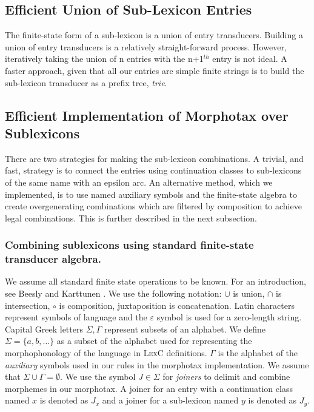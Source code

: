 \documentclass[postprint]{flammie}
\begin{document}
\subsection{Efficient Union of Sub-Lexicon Entries}
\label{subsec:lexc-union}

The finite-state form of a sub-lexicon is a union of entry
transducers.  Building a union of entry transducers is a relatively
straight-forward process. However, iteratively taking the union of n
entries with the n+1$^{th}$ entry is not ideal. A faster approach,
given that all our entries are simple finite strings is to build the
sub-lexicon transducer as a prefix tree, \emph{trie}.

\subsection{Efficient Implementation of Morphotax over Sublexicons}
\label{subsec:lexc-morphotax}

There are two strategies for making the sub-lexicon combinations. A
trivial, and fast, strategy is to connect the entries using
continuation classes to sub-lexicons of the same name with an epsilon
arc. An alternative method, which we implemented, is to use named
auxiliary symbols and the finite-state algebra to create
overgenerating combinations which are filtered by composition to
achieve legal combinations. This is further described in the next
subsection.

\subsubsection{Combining sublexicons using standard finite-state transducer algebra.}
We assume all standard finite state operations to be known. For an
introduction, see Beesly and Karttunen \cite{beesley03}. We use the
following notation: $\cup$ is union, $\cap$ is intersection, $\circ$
is composition, juxtaposition is concatenation. Latin characters
represent symbols of language and the $\varepsilon$ symbol is used for
a zero-length string.  Capital Greek letters $\Sigma, \Gamma$
represent subsets of an alphabet.  We define $\Sigma = \{a, b,
\ldots\}$ as a subset of the alphabet used for representing the
morphophonology of the language in \textsc{LexC} definitions. $\Gamma$
is the alphabet of the \emph{auxiliary} symbols used in our rules in
the morphotax implementation. We assume that $\Sigma \cup \Gamma =
\emptyset$.  We use the symbol $J \in \Sigma$ for \emph{joiners} to
delimit and combine morphemes in our morphotax.  A joiner for an entry
with a continuation class named $x$ is denoted as $J_{x}$ and a joiner
for a sub-lexicon named $y$ is denoted as $J_{y}$.
\end{document}
